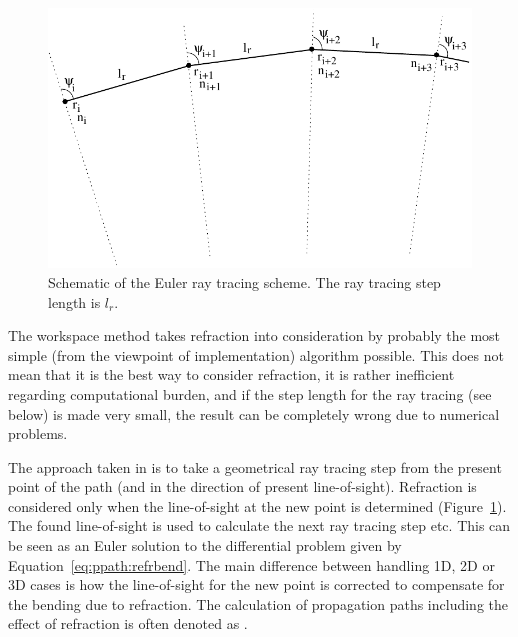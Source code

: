 \begin{figure}[!t]
 \begin{center}
  \includegraphics*{Figs/ppath/euler}
  \caption{Schematic of the Euler ray tracing scheme. The ray tracing step 
    length is $l_r$. }
  \label{fig:ppath:euler}  
 \end{center}
\end{figure}

The workspace method  takes
refraction into consideration by probably the most simple (from the
viewpoint of implementation) algorithm possible. This does not mean
that it is the best way to consider refraction, it is rather
inefficient regarding computational burden, and if the step length for
the ray tracing (see below) is made very small, the result can be
completely wrong due to numerical problems.

The approach taken in  is to
take a geometrical ray tracing step from the present point of the path
(and in the direction of present line-of-sight). Refraction is
considered only when the line-of-sight at the new point is determined
(Figure~\ref{fig:ppath:euler}). The found line-of-sight is used to
calculate the next ray tracing step etc. This can be seen as an Euler
solution to the differential problem given by
Equation~\ref{eq:ppath:refrbend}. The main difference between handling
1D, 2D or 3D cases is how the line-of-sight for the new point is
corrected to compensate for the bending due to refraction. The
calculation of propagation paths including the effect of refraction is
often denoted as .

